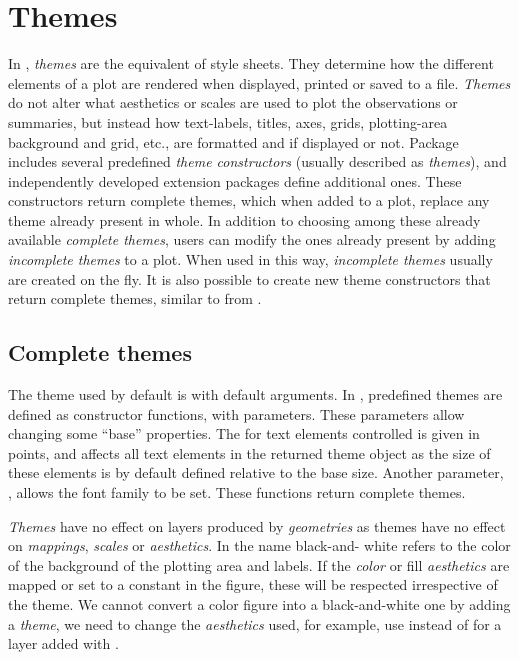 \documentclass[krantz2]{krantz}\usepackage{knitr}
\begin{document}
\section{Themes}\label{sec:plot:themes}
In \ggplot, \emph{themes} are the equivalent of style sheets. They determine how the different elements of a plot are rendered when displayed, printed or saved to a file. \emph{Themes} do not alter what aesthetics or scales are used to plot the observations or summaries, but instead how text-labels, titles, axes, grids, plotting-area background and grid, etc., are formatted and if displayed or not. Package \ggplot includes several predefined \emph{theme constructors} (usually described as \emph{themes}), and independently developed extension packages define additional ones. These constructors return complete themes, which when added to a plot, replace any theme already present in whole. In addition to choosing among these already available \emph{complete themes}, users can modify the ones already present by adding \emph{incomplete themes} to a plot. When used in this way, \emph{incomplete themes} usually are created on the fly. It is also possible to create new theme constructors that return complete themes, similar to  from \ggplot.

\subsection{Complete themes}
The theme used by default is  with default arguments. In , predefined themes are defined as constructor functions, with parameters. These parameters allow changing some ``base'' properties. The  for text elements controlled is given in points, and affects all text elements in the returned theme object as the size of these elements is by default defined relative to the base size. Another parameter, , allows the font family to be set. These functions return complete themes.

\begin{warningbox}
\emph{Themes} have no effect on layers produced by \emph{geometries} as themes have no effect on \emph{mappings}, \emph{scales} or \emph{aesthetics}. In the name  black-and- white refers to the color of the background of the plotting area and labels. If the \emph{color} or fill \emph{aesthetics} are mapped or set to a constant in the figure, these will be respected irrespective of the theme. We cannot convert a color figure into a black-and-white one by adding a \emph{theme}, we need to change the \emph{aesthetics} used, for example, use  instead of  for a layer added with .
\end{warningbox}
\end{document}
